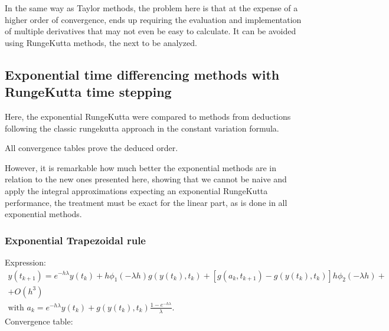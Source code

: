 \documentclass[letterpaper,10pt,english]{jupyterBook}
\begin{document}
\sphinxAtStartPar
In the same way as Taylor methods, the problem here is that at the expense of a higher order of convergence, ends up requiring the evaluation and implementation of multiple derivatives that may not even be easy to calculate. It can be avoided using Runge\sphinxhyphen{}Kutta methods, the next to be analyzed.


\subsection{Exponential time differencing methods with Runge\sphinxhyphen{}Kutta time stepping}
\label{\detokenize{cap4:exponential-time-differencing-methods-with-runge-kutta-time-stepping}}
\sphinxAtStartPar
Here, the exponential Runge\sphinxhyphen{}Kutta were compared to methods from deductions following the classic runge\sphinxhyphen{}kutta approach in the constant variation formula.

\sphinxAtStartPar
All convergence tables prove the deduced order.

\sphinxAtStartPar
However, it is remarkable how much better the exponential methods are in relation to the new ones presented here, showing that we cannot be naive and apply the integral approximations expecting an exponential Runge\sphinxhyphen{}Kutta performance, the treatment must be exact for the linear part, as is done in all exponential methods.


\subsubsection{Exponential \sphinxhyphen{} Trapezoidal rule}
\label{\detokenize{cap4:exponential-trapezoidal-rule}}
\sphinxAtStartPar
Expression:
\begin{equation*}
\begin{split}
  y(t_{k+1}) = e^{-h \lambda} y(t_k) +
  h \phi_1 (-\lambda h) g(y(t_k), t_k) +
  \left[g(a_k, t_{k+1}) - g(y(t_k), t_k) \right] h \phi_2 (-\lambda h) + \\
  + O(h^3) \\
  \text{with } a_k = e^{-h \lambda}y(t_k) + g(y(t_k), t_k) \frac{1-e^{-h\lambda}}{\lambda}.
\end{split}
\end{equation*}
\sphinxAtStartPar
Convergence table:
\end{document}
